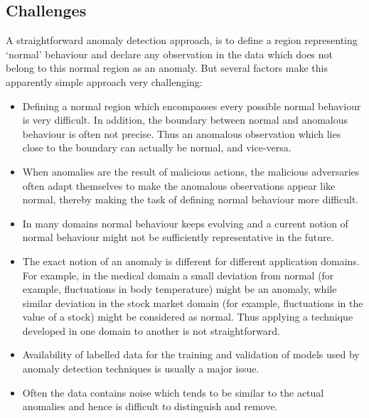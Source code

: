 \subsection{Challenges}
\label{anomalyDetection:challenges}
A straightforward anomaly detection approach, is to define a region representing
`normal' behaviour and declare any observation in the data which does not belong
to this normal region as an anomaly. But several factors make this apparently
simple approach very challenging:

\begin{itemize}

\item Defining a normal region which encompasses every possible normal behaviour
is very difficult. In addition, the boundary between normal and anomalous
behaviour is often not precise. Thus an anomalous observation which lies close
to the boundary can actually be normal, and vice-versa.

\item When anomalies are the result of malicious actions, the malicious
adversaries often adapt themselves to make the anomalous observations appear
like normal, thereby making the task of defining normal behaviour more
difficult.

\item In many domains normal behaviour keeps evolving and a current notion of
normal behaviour might not be sufficiently representative in the future.

\item The exact notion of an anomaly is different for different application
domains. For example, in the medical domain a small deviation from normal (for
example, fluctuations in body temperature) might be an anomaly, while similar
deviation in the stock market domain (for example, fluctuations in the value of
a stock) might be considered as normal. Thus applying a technique developed in
one domain to another is not straightforward.

\item Availability of labelled data for the training and validation of models
used by anomaly detection techniques is usually a major issue.

\item Often the data contains noise which tends to be similar to the actual
anomalies and hence is difficult to distinguish and remove.

\end{itemize}

